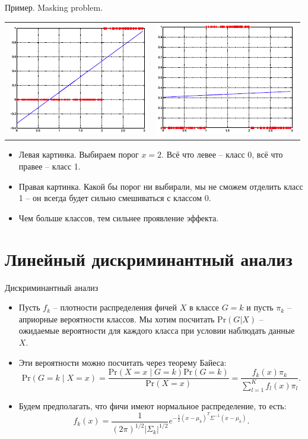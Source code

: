 \documentclass[9pt]{beamer}
\begin{document}
\begin{frame}{Пример. Masking problem.}
\begin{tabular}{cc}
     \includegraphics[height=0.45\textheight]{img/lin_reg_classification_masking_1.png}&
     \includegraphics[height=0.45\textheight]{img/lin_reg_classification_masking_2.png}  \\
\end{tabular}
\begin{itemize}
    \item Левая картинка. Выбираем порог $x = 2$. Всё что левее -- класс 0, всё что правее -- класс 1.
    \item Правая картинка. Какой бы порог ни выбирали, мы не сможем отделить класс 1 -- он всегда будет сильно смешиваться с классом 0.
    \item Чем больше классов, тем сильнее проявление эффекта.
\end{itemize}
\end{frame}

\section{Линейный дискриминантный анализ}

\begin{frame}{Дискриминантный анализ}
\begin{itemize}
    \item Пусть $f_k$ -- плотности распределения фичей $X$ в классе $G = k$ и пусть $\pi_k$ -- априорные вероятности классов. Мы хотим посчитать $\text{Pr}(G|X)$ -- ожидаемые вероятности для каждого класса при условии наблюдать данные $X$.
    \item Эти вероятности можно посчитать через теорему Байеса:
    $$\text{Pr}(G=k \;|\; X = x) = \frac{\text{Pr}(X = x \;|\; G=k)\text{Pr}(G=k)}{\text{Pr}(X=x)} = \frac{f_k(x)\pi_k}{\sum_{l=1}^K f_l(x)\pi_l}.$$
    \item Будем предполагать, что фичи имеют нормальное распределение, то есть:
    $$f_k(x) = \frac{1}{(2\pi)^{1/2}|\Sigma_k|^{1/2}} e^{-\frac{1}{2}(x-\mu_k)^T\Sigma^{-1}(x-\mu_k)}.$$
\end{itemize}
\end{frame}
\end{document}
